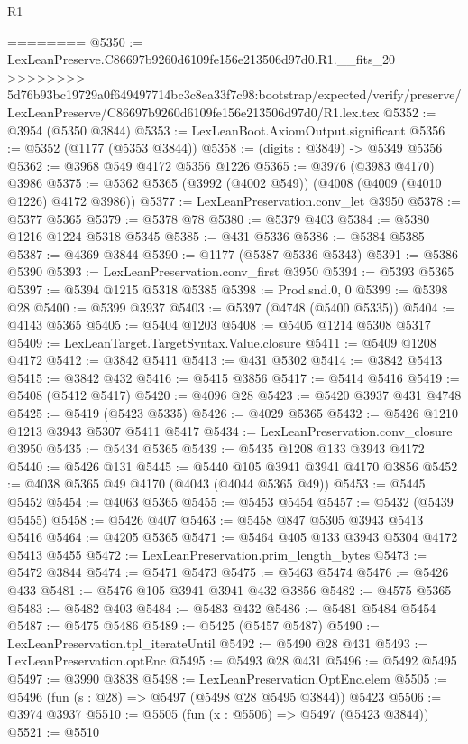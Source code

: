\begin{lexlean}{R1}
\begin{coremodule}
{{{{{{{{{{{{{{{{{{{{{{{{{{{{{{{{{{{{{{{{{{{{{{{{{{{{{{{{{{{{{{{{{{{{{{{{{{{{{{{{{{{{{{{{{{{{{{{{{{{{{{{{{{{{{{{{{{{{{{{{{{{{{{{{{{{{{{{{{{{{{{{{{{{{{{{{{{{{{{{{{{{{{{{{{{{{{{{{{{{{{{{{{{========
@5350 := LexLeanPreserve.C86697b9260d6109fe156e213506d97d0.R1.__fits_20
>>>>>>>> 5d76b93bc19729a0f649497714bc3c8ea33f7c98:bootstrap/expected/verify/preserve/LexLeanPreserve/C86697b9260d6109fe156e213506d97d0/R1.lex.tex
@5352 := @3954 (@5350 @3844)
@5353 := LexLeanBoot.AxiomOutput.significant
@5356 := @5352 (@1177 (@5353 @3844))
@5358 := (digits : @3849) -> @5349 @5356
@5362 := @3968 @549 @4172 @5356 @1226
@5365 := @3976 (@3983 @4170) @3986
@5375 := @5362 @5365 (@3992 (@4002 @549)) (@4008 (@4009 (@4010 @1226) @4172 @3986))
@5377 := LexLeanPreservation.conv_let @3950
@5378 := @5377 @5365
@5379 := @5378 @78
@5380 := @5379 @403
@5384 := @5380 @1216 @1224 @5318 @5345
@5385 := @431 @5336
@5386 := @5384 @5385
@5387 := @4369 @3844
@5390 := @1177 (@5387 @5336 @5343)
@5391 := @5386 @5390
@5393 := LexLeanPreservation.conv_first @3950
@5394 := @5393 @5365
@5397 := @5394 @1215 @5318 @5385
@5398 := Prod.snd.{0, 0}
@5399 := @5398 @28
@5400 := @5399 @3937
@5403 := @5397 (@4748 (@5400 @5335))
@5404 := @4143 @5365
@5405 := @5404 @1203
@5408 := @5405 @1214 @5308 @5317
@5409 := LexLeanTarget.TargetSyntax.Value.closure
@5411 := @5409 @1208 @4172
@5412 := @3842 @5411
@5413 := @431 @5302
@5414 := @3842 @5413
@5415 := @3842 @432
@5416 := @5415 @3856
@5417 := @5414 @5416
@5419 := @5408 (@5412 @5417)
@5420 := @4096 @28
@5423 := @5420 @3937 @431 @4748
@5425 := @5419 (@5423 @5335)
@5426 := @4029 @5365
@5432 := @5426 @1210 @1213 @3943 @5307 @5411 @5417
@5434 := LexLeanPreservation.conv_closure @3950
@5435 := @5434 @5365
@5439 := @5435 @1208 @133 @3943 @4172
@5440 := @5426 @131
@5445 := @5440 @105 @3941 @3941 @4170 @3856
@5452 := @4038 @5365 @49 @4170 (@4043 (@4044 @5365 @49))
@5453 := @5445 @5452
@5454 := @4063 @5365
@5455 := @5453 @5454
@5457 := @5432 (@5439 @5455)
@5458 := @5426 @407
@5463 := @5458 @847 @5305 @3943 @5413 @5416
@5464 := @4205 @5365
@5471 := @5464 @405 @133 @3943 @5304 @4172 @5413 @5455
@5472 := LexLeanPreservation.prim_length_bytes
@5473 := @5472 @3844
@5474 := @5471 @5473
@5475 := @5463 @5474
@5476 := @5426 @433
@5481 := @5476 @105 @3941 @3941 @432 @3856
@5482 := @4575 @5365
@5483 := @5482 @403
@5484 := @5483 @432
@5486 := @5481 @5484 @5454
@5487 := @5475 @5486
@5489 := @5425 (@5457 @5487)
@5490 := LexLeanPreservation.tpl_iterateUntil
@5492 := @5490 @28 @431
@5493 := LexLeanPreservation.optEnc
@5495 := @5493 @28 @431
@5496 := @5492 @5495
@5497 := @3990 @3838
@5498 := LexLeanPreservation.OptEnc.elem
@5505 := @5496 (fun (s : @28) => @5497 (@5498 @28 @5495 @3844)) @5423
@5506 := @3974 @3937
@5510 := @5505 (fun (x : @5506) => @5497 (@5423 @3844))
@5521 := @5510
}}}}}}}}}}}}}}}}}}}}}}}}}}}}}}}}}}}}}}}}}}}}}}}}}}}}}}}}}}}}}}}}}}}}}}}}}}}}}}}}}}}}}}}}}}}}}}}}}}}}}}}}}}}}}}}}}}}}}}}}}}}}}}}}}}}}}}}}}}}}}}}}}}}}}}}}}}}}}}}}}}}}}}}}}}}}}}}}}}}}}}}}}}
\end{coremodule}
\end{lexlean}
